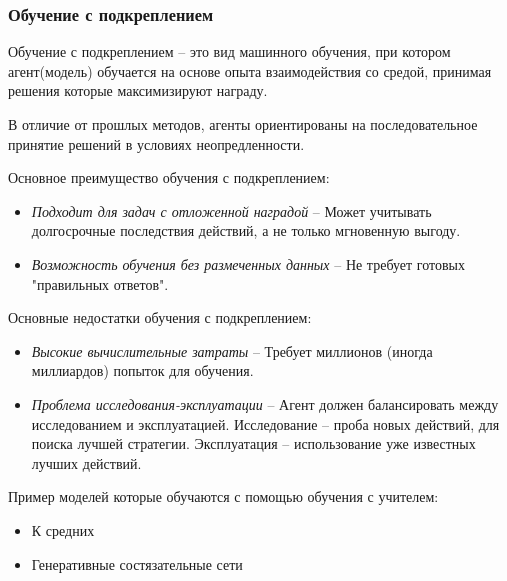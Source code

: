 \documentclass[../part_1.tex]{subfiles}
\begin{document}
\subsubsection{Обучение с подкреплением} %
    \label{sec:reinforcement_learning}
    \par Обучение с подкреплением --  это вид машинного обучения, при котором агент(модель) обучается на основе опыта взаимодействия со средой, принимая решения которые максимизируют награду.
    \par В отличие от прошлых методов, агенты ориентированы на последовательное принятие решений в условиях неопредленности.
    \par Основное преимущество обучения с подкреплением:
    \begin{itemize}
        \item \textit{Подходит для задач с отложенной наградой} -- Может учитывать долгосрочные последствия действий, а не только мгновенную выгоду.
        \item \textit{Возможность обучения без размеченных данных} -- Не требует готовых "правильных ответов".
    \end{itemize}
    \par Основные недостатки обучения с подкреплением:
    \begin{itemize}
        \item \textit{Высокие вычислительные затраты} -- Требует миллионов (иногда миллиардов) попыток для обучения.
        \item \textit{Проблема исследования-эксплуатации} -- Агент должен балансировать между исследованием и эксплуатацией. Исследование -- проба новых действий, для поиска лучшей стратегии. Эксплуатация -- использование уже известных лучших действий.
    \end{itemize}
    \par Пример моделей которые обучаются с помощью обучения с учителем:
    \begin{itemize}
        \item К средних
        \item Генеративные состязательные сети
    \end{itemize}
\end{document}
